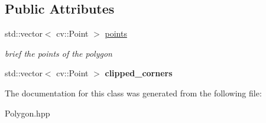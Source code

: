 \subsection*{Public Attributes}
\begin{DoxyCompactItemize}
\item 
\mbox{\label{class_polygon_a347474823f6113a34fdefeee276d1b9e}} 
std\+::vector$<$ cv\+::\+Point $>$ \mbox{\hyperlink{class_polygon_a347474823f6113a34fdefeee276d1b9e}{points}}
\begin{DoxyCompactList}\small\item\em brief the points of the polygon \end{DoxyCompactList}\item 
\mbox{\label{class_polygon_a66cacfeac5d5f3b6852dd558abf3dc38}} 
std\+::vector$<$ cv\+::\+Point $>$ {\bfseries clipped\+\_\+corners}
\end{DoxyCompactItemize}


The documentation for this class was generated from the following file\+:\begin{DoxyCompactItemize}
\item 
Polygon.\+hpp\end{DoxyCompactItemize}
